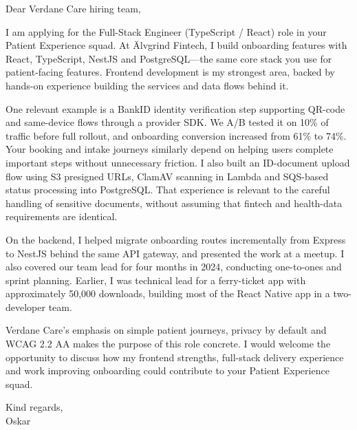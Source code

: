 \documentclass[11pt,a4paper]{article}
\begin{document}
Dear Verdane Care hiring team,

I am applying for the Full-Stack Engineer (TypeScript / React) role in your Patient Experience squad. At Älvgrind Fintech, I build onboarding features with React, TypeScript, NestJS and PostgreSQL—the same core stack you use for patient-facing features. Frontend development is my strongest area, backed by hands-on experience building the services and data flows behind it.

One relevant example is a BankID identity verification step supporting QR-code and same-device flows through a provider SDK. We A/B tested it on 10\% of traffic before full rollout, and onboarding conversion increased from 61\% to 74\%. Your booking and intake journeys similarly depend on helping users complete important steps without unnecessary friction. I also built an ID-document upload flow using S3 presigned URLs, ClamAV scanning in Lambda and SQS-based status processing into PostgreSQL. That experience is relevant to the careful handling of sensitive documents, without assuming that fintech and health-data requirements are identical.

On the backend, I helped migrate onboarding routes incrementally from Express to NestJS behind the same API gateway, and presented the work at a meetup. I also covered our team lead for four months in 2024, conducting one-to-ones and sprint planning. Earlier, I was technical lead for a ferry-ticket app with approximately 50,000 downloads, building most of the React Native app in a two-developer team.

Verdane Care's emphasis on simple patient journeys, privacy by default and WCAG 2.2 AA makes the purpose of this role concrete. I would welcome the opportunity to discuss how my frontend strengths, full-stack delivery experience and work improving onboarding could contribute to your Patient Experience squad.

Kind regards,\\
Oskar
\end{document}
